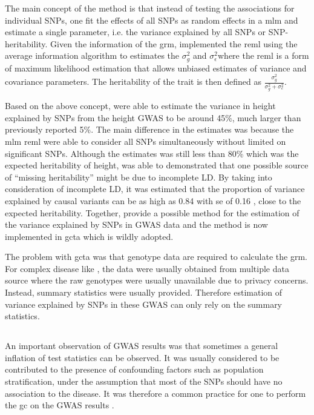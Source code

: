 	The main concept of the method is that instead of testing the associations for individual \glspl{SNP}, one fit the effects of all SNPs as random effects in a \gls{mlm} and estimate a single parameter, i.e. the variance explained by all \glspl{SNP} or \gls{SNP}-heritability.
	Given the information of the \gls{grm}, \citet{Yang2011} implemented the \gls{reml} using the average information algorithm to estimates the $\sigma_g^2$ and $\sigma_\epsilon^2$where the \gls{reml} is a form of maximum likelihood estimation that allows unbiased estimates of variance and covariance parameters.
	The heritability of the trait is then defined as $\frac{\sigma_g^2}{\sigma_g^2+\sigma_e^2}$.
	
	Based on the above concept, \citet{Yang2010a} were able to estimate the variance in height explained by \glspl{SNP} from the height \gls{GWAS} to be around 45\%, much larger than previously reported 5\%.
	The main difference in the estimates was because the \gls{mlm} \gls{reml} were able to consider all \glspl{SNP} simultaneously without limited on significant \glspl{SNP}.
	Although the estimates was still less than 80\% which was the expected heritability of height, \citet{Yang2010a} was able to demonstrated that one possible source of ``missing heritability'' might be due to incomplete \gls{LD}.
	By taking into consideration of incomplete \gls{LD}, it was estimated that the proportion of variance explained by causal variants can be as high as 0.84 with \gls{se} of 0.16 \citep{Yang2010a}, close to the expected heritability.
	Together, \citet{Yang2011} provide a possible method for the estimation of the variance explained by \glspl{SNP} in \gls{GWAS} data and the method is now implemented in \gls{gcta} which is wildly adopted.
	
	The problem with \gls{gcta} was that genotype data are required to calculate the \gls{grm}.
	For complex disease like , the data were usually obtained from multiple data source where the raw genotypes were usually unavailable due to privacy concerns.
	Instead, summary statistics were usually provided.
	Therefore estimation of variance explained by \glspl{SNP} in these \gls{GWAS} can only rely on the summary statistics. 
	  
	\subsection{}
	An important observation of \gls{GWAS} results was that sometimes a general inflation of test statistics can be observed. 
	It was usually considered to be contributed to the presence of confounding factors such as population stratification, under the assumption that most of the \glspl{SNP} should have no association to the disease.
	It was therefore a common practice for one to perform the \gls{gc} on the \gls{GWAS} results \citep{Zheng2006}.
	
